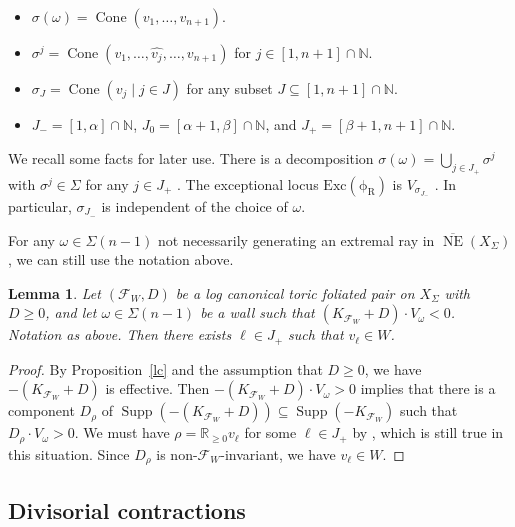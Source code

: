 \documentclass[12pt,reqno]{amsart}
\newtheorem{lemma}[theorem]{Lemma}
\theoremstyle{definition}
\newcommand{\mc}{\mathcal}
\newcommand{\mb}{\mathbb}
\newcommand{\on}{\operatorname}
\newcommand\cF{{\mathcal{F}}}
\newcommand\bN{{\mathbb N}}
\begin{document}
\begin{itemize}
    \item $\sigma(\omega)=\on{Cone}(v_1,\ldots,v_{n+1})$.
    \item $\sigma^j=\on{Cone}(v_1,\ldots, \widehat{v_j},\ldots,v_{n+1})$ for $j\in [1,n+1]\cap\bN$.
    \item $\sigma_J=\on{Cone}(v_j\mid j\in J)$ for any subset $J\subseteq [1,n+1]\cap\bN$.
    \item $J_-=[1,\alpha]\cap\bN$, $J_0=[\alpha+1,\beta]\cap\mb N$, and $J_+=[\beta+1,n+1]\cap\bN$.
\end{itemize}    



We recall some facts for later use. There is a decomposition $\sigma(\omega)=\bigcup_{j\in J_+}\sigma^j$ with $\sigma^j\in\Sigma$ for any $j\in J_+$ \cite[Proposition 14-2-1]{matsuki2002mmp}. The exceptional locus $\on{Exc(\phi_R)}$ is $V_{\sigma_{J_-}}$ \cite[Corollary 14-2-2]{matsuki2002mmp}. In particular, $\sigma_{J_-}$ is independent of the choice of $\omega$. 

For any $\omega\in\Sigma(n-1)$ not necessarily generating an extremal ray in $\overline{\on{NE}}(X_\Sigma)$, we can still use the notation above.

\begin{lemma}\label{lc_positive_ray}
    Let $(\cF_W,D)$ be a log canonical toric foliated pair on $X_\Sigma$ with $D\geq 0$, and let $\omega\in\Sigma(n-1)$ be a wall such that $(K_{\mc F_W}+D)\cdot V_\omega<0$. Notation as above. Then there exists $\ell\in J_+$ such that $v_\ell\in W$. 
\end{lemma}

\begin{proof}
    By Proposition~\ref{lc} and the assumption that $D\geq 0$, we have $-(K_{\mc F_W}+D)$ is effective.
    Then $-(K_{\mc F_W}+D)\cdot V_\omega>0$ implies that there is a component $D_\rho$ of $\on{Supp}(-(K_{\mc F_W}+D))\subseteq\on{Supp}(-K_{\mc F_W})$ such that $D_\rho\cdot V_\omega>0$. We must have $\rho=\mb R_{\geq 0}v_\ell$ for some $\ell\in J_+$ by \cite[Lemma~14-1-7]{matsuki2002mmp}, which is still true in this situation. Since $D_\rho$ is non-$\mc F_W$-invariant, we have $v_\ell\in W$.
\end{proof}

\subsection{Divisorial contractions}
\end{document}
